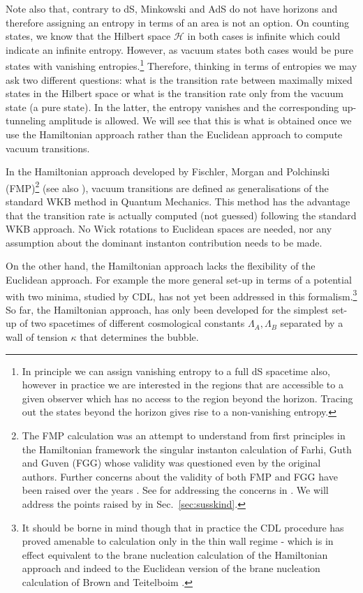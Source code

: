 \documentclass[a4paper,11pt]{article}
\numberwithin{equation}{section}
\numberwithin{equation}{section}
\begin{document}
Note also that, contrary to dS, Minkowski and AdS do not have horizons and therefore assigning an entropy in terms of an area is not an option. On counting states, we know that the Hilbert space $\mathcal H$ in both cases is infinite which could indicate an infinite entropy. However, as  vacuum states both cases would be pure states with vanishing entropies.\footnote{In principle we can assign vanishing entropy to a full dS spacetime also, however in practice we are interested in the regions that are accessible to a given observer which has no access to the region beyond the horizon. Tracing out the states beyond the horizon gives rise to a non-vanishing entropy.} 
Therefore, thinking in terms of entropies we may ask two different questions: what is the transition rate between maximally mixed states in the Hilbert space or what is the transition rate only from the vacuum state (a  pure state). In the latter, the entropy vanishes and the corresponding up-tunneling amplitude is allowed. We will see that this is what is obtained once we use the Hamiltonian approach rather than the Euclidean approach to compute vacuum transitions.
 \vskip 1mm
 
 In the Hamiltonian approach developed by Fischler, Morgan and Polchinski (FMP)\footnote{The FMP calculation was an attempt to understand from first principles in the Hamiltonian framework the singular instanton calculation of Farhi, Guth and Guven (FGG) \cite{Farhi:1989yr} whose validity was questioned even  by the original authors. Further concerns about the validity of both FMP and FGG have been raised over the years \cite{Freivogel:2005qh, Fu:2019oyc, Susskind:2021yvs}. See \cite{DeAlwis:2019rxg} for addressing the concerns in \cite{Freivogel:2005qh}. We will address the points raised by \cite{Susskind:2021yvs} in Sec.~\eqref{sec:susskind}. } \cite{Fischler:1989se,Fischler:1990pk} (see also \cite{Bachlechner:2016mtp, DeAlwis:2019rxg}),
vacuum transitions are defined as generalisations of the standard WKB method in Quantum Mechanics. This method has the advantage that the transition rate is actually computed (not guessed) following the standard WKB approach. No Wick rotations to Euclidean spaces are needed, nor any assumption about the dominant instanton contribution needs to be made. 
\vskip 1mm

On the other hand, the Hamiltonian approach lacks the flexibility of the Euclidean approach. For example the more general set-up in terms of a potential with two minima,  studied by CDL,  has not yet  been addressed in this formalism.\footnote{It should be borne in mind though that in practice the CDL procedure has proved amenable to calculation only in the thin wall regime - which is in effect equivalent to the brane nucleation calculation of the Hamiltonian approach and indeed to the Euclidean version of the brane nucleation calculation of Brown and Teitelboim \cite{Brown:1988kg}.} So far,  the Hamiltonian approach,  has only been developed for the simplest set-up of two  spacetimes of different cosmological constants $\Lambda_A, \Lambda_B$ separated by a wall of tension $\kappa$ that determines the bubble.  
\vskip 1mm
\end{document}
